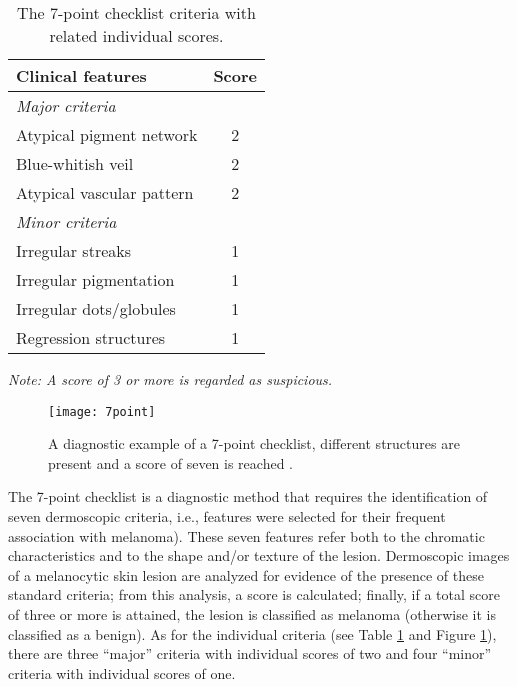 \begin{table}[!htbp]
\centering
\caption{The 7-point checklist criteria with related
individual scores.}\label{tab:point}
\begin{tabular}{p{9cm}c}
\toprule
\rowcolor{dGray}
\textbf{Clinical features}& \textbf{Score}\\
\midrule
\rowcolor{Gray}
\textit{Major criteria} &\\ 
\rowcolor{Gray}
Atypical pigment network & 2\\
\rowcolor{Gray}
Blue-whitish veil & 2\\
\rowcolor{Gray}
Atypical vascular pattern & 2\\
\midrule
\rowcolor{Lightgrey}
\textit{Minor criteria} & \\
\rowcolor{Lightgrey}
Irregular streaks & 1\\
\rowcolor{Lightgrey}
Irregular pigmentation& 1\\
\rowcolor{Lightgrey}
Irregular dots/globules & 1\\
\rowcolor{Lightgrey}
Regression structures& 1\\
\bottomrule
\end{tabular}
\begin{tablenotes}
        \footnotesize
        \item \textit{Note: A score of 3 or more is regarded as suspicious.}
      \end{tablenotes}
\end{table}


\begin{figure}[!h]
\centering
	\texttt{[image: 7point]}
		\caption{A diagnostic example of a 7-point checklist,  different structures are present and a score of seven is reached \cite{di2004elm}.}
		\label{Fig:7point} 
\end{figure}

The 7-point checklist is a diagnostic method that requires the identification of  seven dermoscopic criteria, i.e., features were selected for their frequent association with melanoma). These seven features refer both to the chromatic characteristics and to the shape and/or texture of the lesion. Dermoscopic images of a melanocytic skin lesion are analyzed for  evidence of the presence of these standard criteria; from this analysis, a score is calculated; finally, if a total score of three or more is attained, the lesion is classified as melanoma (otherwise it is classified as a benign). As for the individual criteria (see Table \ref{tab:point} and Figure \ref{Fig:7point}), there are three “major” criteria with individual scores of two and four “minor” criteria with individual scores of one.





